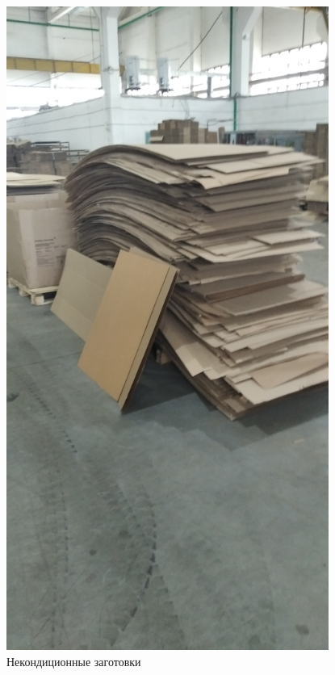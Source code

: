 \begin{figure}
\begin{center}
  \includegraphics[height=0.94\textheight, width=0.94\textwidth, keepaspectratio]{Pics 1/7 Прокладки из брака для упаковки.jpg }
\end{center}
  \caption{Некондиционные заготовки}
  \label{pic:7 Прокладки из брака для упаковки}
\end{figure}

